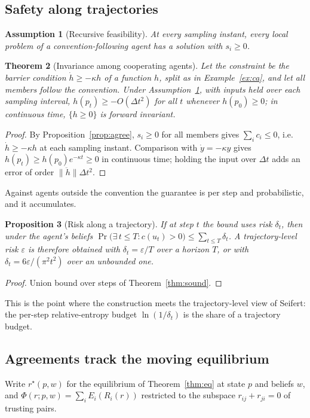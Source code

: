 \documentclass[11pt]{article}
\newtheorem{theorem}{Theorem}[section]
\newtheorem{proposition}[theorem]{Proposition}
\newtheorem{assumption}[theorem]{Assumption}
\theoremstyle{definition}
\theoremstyle{remark}
\renewcommand{\Pr}{\operatorname{Pr}}
\begin{document}
\subsection{Safety along trajectories}
\begin{assumption}[Recursive feasibility]\label{ass:rf}
At every sampling instant, every local problem of a convention-following agent has a solution with $s_i\ge0$.
\end{assumption}

\begin{theorem}[Invariance among cooperating agents]
Let the constraint be the barrier condition $\dot h\ge-\kappa h$ of a function $h$, split as in Example~\ref{ex:ca}, and let all members follow the convention. Under Assumption~\ref{ass:rf}, with inputs held over each sampling interval, $h(p_t)\ge-O(\Delta t^2)$ for all $t$ whenever $h(p_0)\ge0$; in continuous time, $\{h\ge0\}$ is forward invariant.
\end{theorem}
\begin{proof}
By Proposition~\ref{prop:agree}, $s_i\ge0$ for all members gives $\sum_ic_i\le0$, i.e.\ $\dot h\ge-\kappa h$ at each sampling instant. Comparison with $\dot y=-\kappa y$ gives $h(p_t)\ge h(p_0)e^{-\kappa t}\ge0$ in continuous time; holding the input over $\Delta t$ adds an error of order $\|\ddot h\|\Delta t^2$.
\end{proof}

Against agents outside the convention the guarantee is per step and probabilistic, and it accumulates.

\begin{proposition}[Risk along a trajectory]\label{prop:risk}
If at step $t$ the bound uses risk $\delta_t$, then under the agent's beliefs $\Pr\big(\exists\,t\le T:c(u_t)>0\big)\le\sum_{t\le T}\delta_t$. A trajectory-level risk $\varepsilon$ is therefore obtained with $\delta_t=\varepsilon/T$ over a horizon $T$, or with $\delta_t=6\varepsilon/(\pi^2t^2)$ over an unbounded one.
\end{proposition}
\begin{proof}
Union bound over steps of Theorem~\ref{thm:sound}.
\end{proof}

This is the point where the construction meets the trajectory-level view of Seifert: the per-step relative-entropy budget $\ln(1/\delta_t)$ is the share of a trajectory budget.

\subsection{Agreements track the moving equilibrium}
Write $r^\star(p,w)$ for the equilibrium of Theorem~\ref{thm:eq} at state $p$ and beliefs $w$, and $\Phi(r;p,w)=\sum_iE_i(R_i(r))$ restricted to the subspace $r_{ij}+r_{ji}=0$ of trusting pairs.
\end{document}
